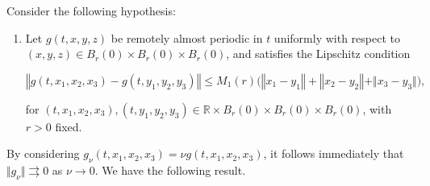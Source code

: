 \documentclass[english,,reqno]{amsart}
\numberwithin{equation}{section}
\newcommand{\bb}[1]{\mathbb{#1}}
\theoremstyle{plain}
\theoremstyle{definition}
\theoremstyle{remark}
\begin{document}
Consider the following hypothesis:
\begin{enumerate}[label=\textbf{(H'.2)}]
\item\label{H2prime} Let $g\left(t,x,y,z\right)$ be remotely almost periodic in $t$ uniformly with respect to $\left(x,y,z\right)\in  B_r (0)\times B_r (0)\times B_r (0)$, and satisfies the Lipschitz condition

\[
\left\Vert g\left(t,x_1,x_2,x_3\right)-g\left(t,y_1,y_2,y_3\right)\right\Vert \leq M_{1}\left(r\right)\big(\left\Vert x_1-y_1\right\Vert +\left\Vert x_2-y_2\right\Vert+ \Vert x_3-y_3\Vert \big),\,
\]
\medskip

for $\left(t,x_1,x_2,x_3\right),\left(t,y_1,y_2,y_3\right)\in \bb{R}\times B_r (0)\times B_r (0)\times B_r (0)$, with $r>0$ fixed.
\end{enumerate}


By considering $g_{\nu}(t, x_1, x_2, x_3) = \nu g(t, x_1, x_2, x_3)$,  
it follows immediately that $\Vert g_{\nu} \Vert \rightrightarrows 0$ as $\nu \to 0$.  
We have the following result.
\end{document}
